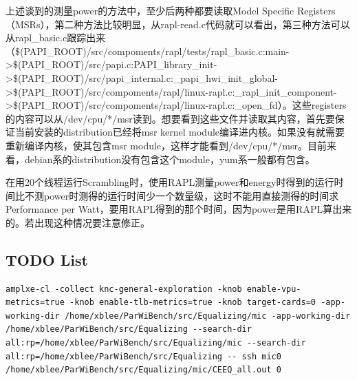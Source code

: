 \documentclass[titlepage]{article}
\numberwithin{figure}{section}
\numberwithin{equation}{section}
\begin{document}
上述谈到的测量power的方法中，至少后两种都要读取Model Specific Registers（MSRs），第二种方法比较明显，从rapl-read.c代码就可以看出，第三种方法可以从rapl_basic.c跟踪出来（\$(PAPI_ROOT)/src/compoments/rapl/tests/rapl_basic.c:main->\$(PAPI_ROOT)/src/papi.c:PAPI_library_init->\$(PAPI_ROOT)/src/papi_internal.c:_papi_hwi_init_global->\$(PAPI_ROOT)/src/compoments/rapl/linux-rapl.c:_rapl_init_component->\$(PAPI_ROOT)/src/compoments/rapl/linux-rapl.c:_open_fd）。这些registers的内容可以从/dev/cpu/*/msr读到\cite{msr}。想要看到这些文件并读取其内容，首先要保证当前安装的distribution已经将msr kernel module编译进内核。如果没有就需要重新编译内核，使其包含msr module，这样才能看到/dev/cpu/*/msr。目前来看，debian系的distribution没有包含这个module，yum系一般都有包含。


在用20个线程运行Scrambling时，使用RAPL测量power和energy时得到的运行时间比不测power时测得的运行时间少一个数量级，这时不能用直接测得的时间求Performance per Watt，要用RAPL得到的那个时间，因为power是用RAPL算出来的。若出现这种情况要注意修正。

\subsection{TODO List}

\begin{verbatim}
amplxe-cl -collect knc-general-exploration -knob enable-vpu-metrics=true -knob enable-tlb-metrics=true -knob target-cards=0 -app-working-dir /home/xblee/ParWiBench/src/Equalizing/mic -app-working-dir /home/xblee/ParWiBench/src/Equalizing --search-dir all:rp=/home/xblee/ParWiBench/src/Equalizing/mic --search-dir all:rp=/home/xblee/ParWiBench/src/Equalizing -- ssh mic0 /home/xblee/ParWiBench/src/Equalizing/mic/CEEQ_all.out 0
\end{verbatim}



\end{document}
